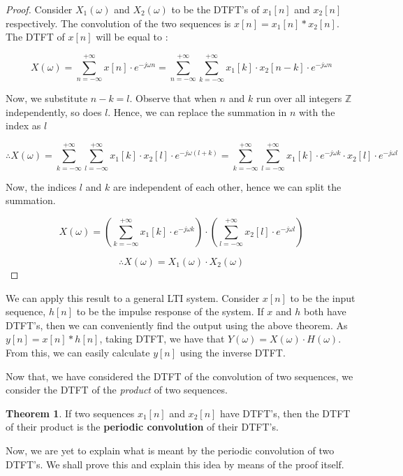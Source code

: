\documentclass{article}
\theoremstyle{definition}
\newtheorem{theorem}{Theorem}[subsection]
\begin{document}
\begin{proof}
Consider $X_1(\omega)$ and $X_2(\omega)$ to be the DTFT's of $x_1[n]$ and $x_2[n]$ respectively. The convolution of the two sequences is $x[n] = x_1[n] * x_2[n]$. The DTFT of $x[n]$ will be equal to :

\[
	X(\omega) = \sum_{n=-\infty}^{+\infty} x[n] \cdot e^{-j\omega n} = \sum_{n=-\infty}^{+\infty} \sum_{k=-\infty}^{+\infty} x_1[k] \cdot x_2[n-k] \cdot e^{-j\omega n} 
\]

Now, we substitute $n-k = l$. Observe that when $n$ and $k$ run over all integers $\mathbb{Z}$ independently, so does $l$. Hence, we can replace the summation in $n$ with the index as $l$

\[
	\therefore X(\omega) = \sum_{k=-\infty}^{+\infty} \sum_{l=-\infty}^{+\infty} x_1[k] \cdot x_2[l] \cdot e^{-j\omega (l+k)} = \sum_{k=-\infty}^{+\infty} \sum_{l=-\infty}^{+\infty} x_1[k] \cdot e^{-j\omega k} \cdot x_2[l] \cdot e^{-j\omega l} 
\]

Now, the indices $l$ and $k$ are independent of each other, hence we can split the summation.

\[
	X(\omega) = \left( \sum_{k=-\infty}^{+\infty} x_1[k] \cdot e^{-j\omega k} \right) \cdot \left( \sum_{l=-\infty}^{+\infty} x_2[l] \cdot e^{-j\omega l} \right)
\]

\[
	\therefore \boxed{X(\omega) = X_1(\omega) \cdot X_2(\omega)}
\]
\end{proof}

We can apply this result to a general LTI system. Consider $x[n]$ to be the input sequence, $h[n]$ to be the impulse response of the system. If $x$ and $h$ both have DTFT's, then we can conveniently find the output using the above theorem. As $y[n] = x[n] * h[n]$, taking DTFT, we have that $Y(\omega) = X(\omega) \cdot H(\omega)$. From this, we can easily calculate $y[n]$ using the inverse DTFT. \smallskip

Now that, we have considered the DTFT of the convolution of two sequences, we consider the DTFT of the \textit{product} of two sequences.

\begin{theorem}
If two sequences $x_1[n]$ and $x_2[n]$ have DTFT's, then the DTFT of their product is the \textbf{periodic convolution} of their DTFT's.
\end{theorem}

Now, we are yet to explain what is meant by the periodic convolution of two DTFT's. We shall prove this and explain this idea by means of the proof itself.
\end{document}
